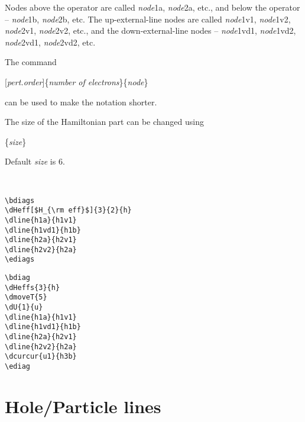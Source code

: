 \documentclass[a4paper]{article}
\newcommand{\myind}{\hspace{10pt}}
\begin{document}
Nodes above the operator are called {\it node}1a, {\it node}2a, etc., 
and below the operator -- {\it node}1b, {\it node}2b, etc.
The up-external-line nodes are called {\it node}1v1, {\it node}1v2, {\it node}2v1, {\it node}2v2, etc.,
and the down-external-line nodes -- {\it node}1vd1, {\it node}1vd2, {\it node}2vd1, {\it node}2vd2, etc.

The command

\myind{\bf \textbackslash dHeffs}[{\it pert.order}]\{{\it number of electrons}\}\{{\it node}\}

can be used to make the notation shorter.

The size of the Hamiltonian part can be changed using

\myind{\bf \textbackslash dheffsize}\{{\it size}\}

Default {\it size} is 6.
 
~\\
 \begin{minipage}[b]{0.55\linewidth}\centering
  \begin{lstlisting}
\bdiags
\dHeff[$H_{\rm eff}$]{3}{2}{h}
\dline{h1a}{h1v1}
\dline{h1vd1}{h1b}
\dline{h2a}{h2v1}
\dline{h2v2}{h2a}
\ediags
  \end{lstlisting}
 \end{minipage}
 \begin{minipage}[b]{0.45\linewidth}\centering
\bdiags
{}
\ediags
 \end{minipage}

 \begin{minipage}[b]{0.55\linewidth}\centering
  \begin{lstlisting}
\bdiag
\dHeffs{3}{h}
\dmoveT{5}
\dU{1}{u}
\dline{h1a}{h1v1}
\dline{h1vd1}{h1b}
\dline{h2a}{h2v1}
\dline{h2v2}{h2a}
\dcurcur{u1}{h3b}
\ediag
  \end{lstlisting}
 \end{minipage}
 \begin{minipage}[b]{0.45\linewidth}\centering
\bdiag
{}
\ediag
 \end{minipage}

\section{Hole/Particle lines}
\end{document}
